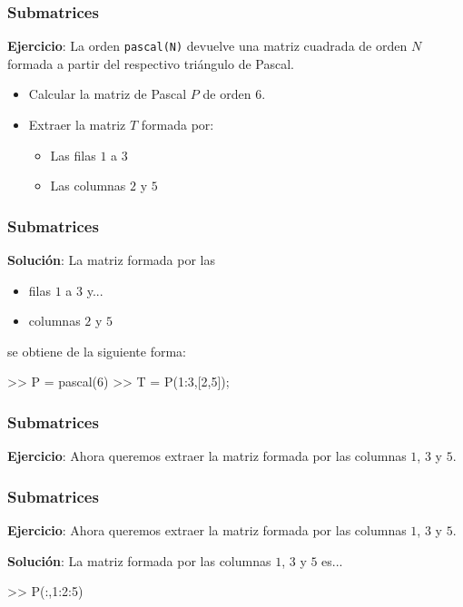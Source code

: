 

\begin{frame}[containsverbatim]
\frametitle{Submatrices}

\textbf{Ejercicio}: La orden \verb|pascal(N)| devuelve una matriz
cuadrada de orden $N$ formada a partir del respectivo triángulo de
Pascal. 
\begin{itemize}
\item Calcular la matriz de Pascal $P$ de orden $6$.
\item 
Extraer la matriz $T$ formada por:
\begin{itemize}
\item Las filas $1$ a $3$
\item Las columnas $2$ y $5$
\end{itemize}
\end{itemize}
\end{frame}

\begin{frame}[containsverbatim]
\frametitle{Submatrices}

\textbf{Solución}: La matriz formada por las
\begin{itemize}
\item filas $1$ a $3$ y...
\item columnas $2$ y $5$
\end{itemize}
se obtiene de la siguiente forma:

\begin{Octave}
>> P = pascal(6)
>> T = P(1:3,[2,5]);
\end{Octave}

\end{frame}


\begin{frame}[containsverbatim]
\frametitle{Submatrices}
\textbf{Ejercicio}: Ahora queremos extraer la matriz formada por las
columnas $1$, $3$ y $5$.
\hfill
\end{frame}

\begin{frame}[containsverbatim]
\frametitle{Submatrices}
\textbf{Ejercicio}: Ahora queremos extraer la matriz formada por las
columnas $1$, $3$ y $5$.

\hfill

\textbf{Solución}: La matriz formada por las
columnas $1$, $3$ y $5$ es...

\begin{Octave}
>> P(:,1:2:5) 
\end{Octave}
 
\end{frame}

